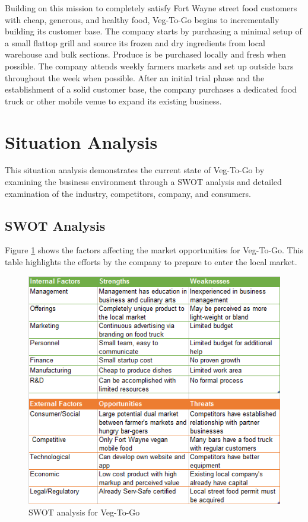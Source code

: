 \documentclass[12pt, letterpaper]{article}
\newcommand{\companyname}{Veg-To-Go}
\begin{document}
Building on this mission to completely satisfy Fort Wayne street food customers with cheap, generous, and healthy food, Veg-To-Go begins to incrementally building its customer base.  The company starts by purchasing a minimal setup of a small flattop grill and source its frozen and dry ingredients from local warehouse and bulk sections. Produce is be purchased locally and fresh when possible.  The company attends weekly farmers markets and set up outside bars throughout the week when possible.  After an initial trial phase and the establishment of a solid customer base, the company purchases a dedicated food truck or other mobile venue to expand its existing business.

\newpage

\section{Situation Analysis}
This situation analysis demonstrates the current state of \companyname{} by examining the business environment through a SWOT analysis and detailed examination of the industry, competitors, company, and consumers.

\subsection{SWOT Analysis}
Figure \ref{SWOT} shows the factors affecting the market opportunities for \companyname{}.  This table highlights the efforts by the company to prepare to enter the local market.

\begin{figure}[H]
	\label{SWOT}
	\caption{SWOT analysis for \companyname{}}
	\centering
	\includegraphics{SWOT}
\end{figure}
\end{document}
